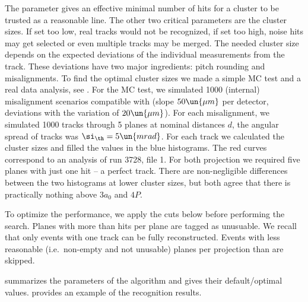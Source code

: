 The  parameter gives an effective minimal number of hits for a cluster to be trusted as a reasonable line. The other two critical parameters are the cluster sizes. If set too low, real tracks would not be recognized, if set too high, noise hits may get selected or even multiple tracks may be merged. The needed cluster size depends on the expected deviations of the individual measurements from the track. These deviations have two major ingredients: pitch rounding and misalignments. To find the optimal cluster sizes we made a simple MC test and a real data analysis, see . For the MC test, we simulated  1000 (internal) misalignment scenarios compatible with  (slope $50\un{\mu m}$ per detector, deviations with the variation of $20\un{\mu m}$). For each misalignment, we simulated 1000 tracks through 5 planes at nominal distances $d$, the angular spread of tracks was $\si_\th = 5\un{mrad}$. For each track we calculated the cluster sizes and filled the values in the blue histograms. The red curves correspond to an analysis of run 3728, file 1. For both projection we required five planes with just one hit -- a perfect track. There are non-negligible differences between the two histograms at lower cluster sizes, but both agree that there is practically nothing above $3a_0$ and $4P$.


To optimize the performance, we apply the cuts below before performing the search.
\bitm
\itm Planes with more than  hits per plane are tagged as unusuable. We recall that only events with one track can be fully reconstructed.
\itm Events with less reasonable (i.e.~non-empty and not unusable) planes per projection than\break {} are skipped.
\eitm

 summarizes the parameters of the algorithm and gives their default/optimal values.  provides an example of the recognition results.



